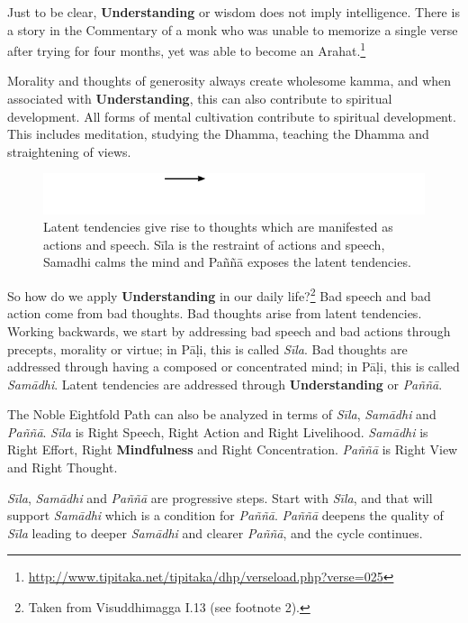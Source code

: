 Just to be clear, \textbf{Understanding} or wisdom does not imply intelligence. There is a story in the Commentary of a monk who was unable to memorize a single verse after trying for four months, yet was able to become an Arahat.\footnote{\url{http://www.tipitaka.net/tipitaka/dhp/verseload.php?verse=025}}

Morality and thoughts of generosity always create wholesome kamma, and when associated with \textbf{Understanding}, this can also contribute to spiritual development. All forms of mental cultivation contribute to spiritual development. This includes meditation, studying the Dhamma, teaching the Dhamma and straightening of views.

\begin{figure}[h]
\centering
\includegraphics[width=0.6\linewidth]{./Diagrams/Sila}
\caption{Latent tendencies give rise to thoughts which are manifested as actions and speech. Sīla is the restraint of actions and speech, Samadhi calms the mind and Paññā exposes the latent tendencies.}
\label{fig:Sila}
\end{figure}

So how do we apply \textbf{Understanding} in our daily life?\footnote{Taken from Visuddhimagga I.13 (see footnote 2).} Bad speech and bad action come from bad thoughts. Bad thoughts arise from latent tendencies. Working backwards, we start by addressing bad speech and bad actions through precepts, morality or virtue; in Pāḷi, this is called \textit{Sīla}. Bad thoughts are addressed through having a composed or concentrated mind; in Pāḷi, this is called \textit{Samādhi}. Latent tendencies are addressed through \textbf{Understanding} or \textit{Paññā}.

The Noble Eightfold Path can also be analyzed in terms of \textit{Sīla}, \textit{Samādhi} and \textit{Paññā}. \textit{Sīla} is Right Speech, Right Action and Right Livelihood. \textit{Samādhi} is Right Effort, Right \textbf{Mindfulness} and Right Concentration. \textit{Paññā} is Right View and Right Thought.

\textit{Sīla}, \textit{Samādhi} and \textit{Paññā} are progressive steps. Start with \textit{Sīla}, and that will support \textit{Samādhi} which is a condition for \textit{Paññā}. \textit{Paññā} deepens the quality of \textit{Sīla} leading to deeper \textit{Samādhi} and clearer \textit{Paññā}, and the cycle continues.

